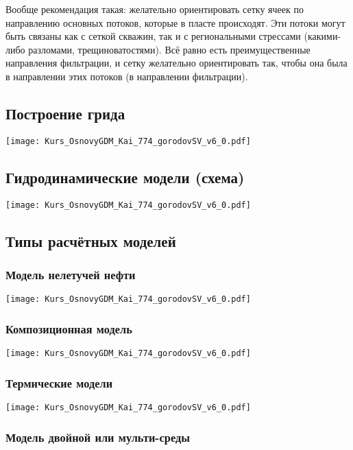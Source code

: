 \documentclass[main.tex]{subfiles}
\begin{document}
Вообще рекомендация такая: желательно ориентировать сетку ячеек по направлению основных потоков, которые в пласте происходят.
Эти потоки могут быть связаны как с сеткой скважин, так и с региональными стрессами (какими-либо разломами, трещиноватостями). Всё равно есть преимущественные направления фильтрации, и сетку желательно ориентировать так, чтобы она была в направлении этих потоков (в направлении фильтрации).

\subsection{Построение грида}

\texttt{[image: Kurs\_OsnovyGDM\_Kai\_774\_gorodovSV\_v6\_0.pdf]}

\subsection{Гидродинамические модели (схема)}

\texttt{[image: Kurs\_OsnovyGDM\_Kai\_774\_gorodovSV\_v6\_0.pdf]}

\subsection{Типы расчётных моделей}

\subsubsection{Модель нелетучей нефти}

\texttt{[image: Kurs\_OsnovyGDM\_Kai\_774\_gorodovSV\_v6\_0.pdf]}

\subsubsection{Композиционная модель}

\texttt{[image: Kurs\_OsnovyGDM\_Kai\_774\_gorodovSV\_v6\_0.pdf]}

\subsubsection{Термические модели}

\texttt{[image: Kurs\_OsnovyGDM\_Kai\_774\_gorodovSV\_v6\_0.pdf]}

\subsubsection{Модель двойной или мульти-среды}
\end{document}
